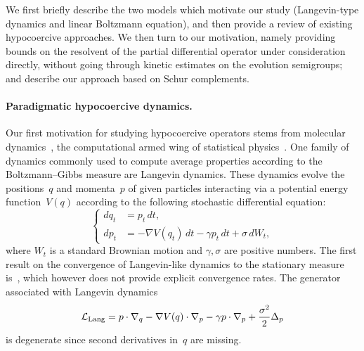 \documentclass{article}
\newcommand{\cL}{\mathcal{L}}
\begin{document}
We first briefly describe the two models which motivate our study
(Langevin-type dynamics and linear Boltzmann equation), and then
provide a review of existing hypocoercive approaches. We then turn to
our motivation, namely providing bounds on the resolvent of the
partial differential operator under consideration directly, without
going through kinetic estimates on the evolution semigroups; and
describe our approach based on Schur complements.
  
\paragraph{Paradigmatic hypocoercive dynamics.}
Our first motivation for studying hypocoercive operators stems from
molecular dynamics~\cite{FrenkelSmit,Tuckerman,LM15,LS16}, the
computational armed wing of statistical physics~\cite{Balian}. One
family of dynamics commonly used to compute average properties according to the
Boltzmann--Gibbs measure are Langevin dynamics. These dynamics evolve the positions~$q$ and momenta~$p$ of given particles interacting via a potential energy function~$V(q)$ according to the following stochastic differential equation:
\[
\left\{
\begin{aligned}
  dq_t & = p_t \, dt,\\
  dp_t & = -\nabla V(q_t) \, dt - \gamma p_t \, dt + \sigma \, dW_t, 
\end{aligned}
\right.
\]
where $W_t$ is a standard Brownian motion and $\gamma,\sigma$ are
positive numbers. The first result on the convergence of Langevin-like
dynamics to the stationary measure is~\cite{Tropper77}, which however does not provide explicit convergence rates. The generator associated with Langevin dynamics
\[
\cL_{\rm Lang} = p \cdot \nabla_q - \nabla V(q) \cdot \nabla_p - \gamma p \cdot \nabla_p + \frac{\sigma^2}{2} \Delta_p
\]
is degenerate since second derivatives in~$q$ are missing.
\end{document}
